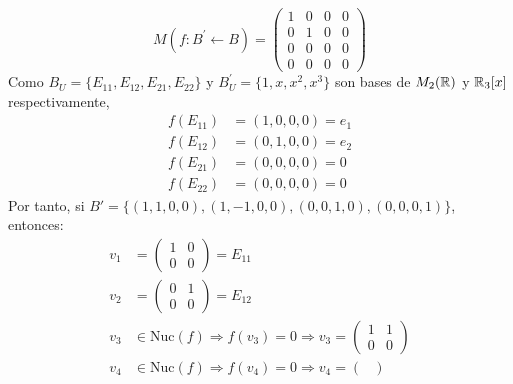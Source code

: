 \documentclass[12pt]{article}
\begin{document}
\begin{enumerate}
\begin{enumerate}
		            \begin{equation*}
			            M(f : B^{'} \leftarrow B) = \begin{pmatrix}
				            1 & 0 & 0 & 0 \\
				            0 & 1 & 0 & 0 \\
				            0 & 0 & 0 & 0 \\
				            0 & 0 & 0 & 0
			            \end{pmatrix}
		            \end{equation*}
		            Como $B_U=\{E_{11},E_{12},E_{21},E_{22}\}$ y $B_U^{'} = \{1,x,x^2,x^3\}$ son bases de $M_2({\mathbb{R}})$ y ${\mathbb{R}}_3[x]$ respectivamente,
		            \begin{align*}
			            f(E_{11}) & = (1,0,0,0) = e_1 \\
			            f(E_{12}) & = (0,1,0,0) = e_2 \\
			            f(E_{21}) & = (0,0,0,0) = 0   \\
			            f(E_{22}) & = (0,0,0,0) = 0
		            \end{align*}
		            Por tanto, si $B'=\{(1,1,0,0),(1,-1,0,0),(0,0,1,0),(0,0,0,1)\}$, entonces:
		            \begin{align*}
			            v_1 & = \begin{pmatrix}
				                    1 & 0 \\
				                    0 & 0
			                    \end{pmatrix} = E_{11}                                                  \\
			            v_2 & = \begin{pmatrix}
				                    0 & 1 \\
				                    0 & 0
			                    \end{pmatrix} = E_{12}                                                  \\
			            v_3 & \in \text{Nuc}(f) \Rightarrow f(v_3) = 0 \Rightarrow v_3 = \begin{pmatrix}
				                                                                             1 & 1 \\
				                                                                             0 & 0
			                                                                             \end{pmatrix} \\
			            v_4 & \in \text{Nuc}(f) \Rightarrow f(v_4) = 0 \Rightarrow v_4 = \begin{pmatrix}

\end{pmatrix}
\end{align*}
\end{enumerate}
\end{enumerate}
\end{document}
